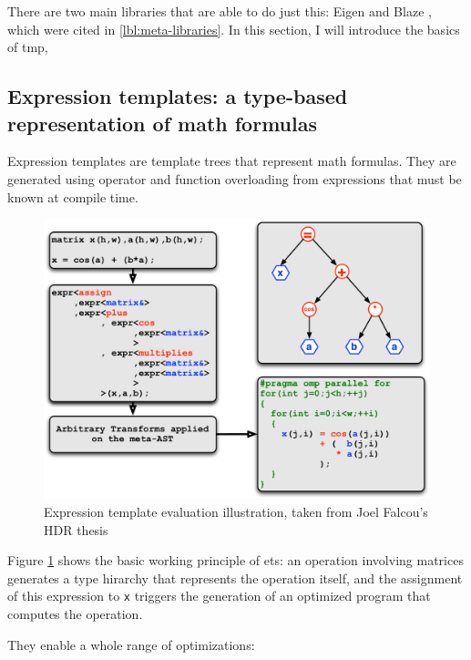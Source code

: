 \documentclass[../main]{subfiles}
\begin{document}
There are two main libraries that are able to do just this: Eigen \cite{eigen}
and Blaze \cite{blazelib}, which were cited in \ref{lbl:meta-libraries}.
In this section, I will introduce the basics of \cpp \gls{tmp},

\subsection{
  Expression templates: a type-based representation of math formulas
}

Expression templates are template trees that represent math formulas.
They are generated using operator and function overloading from expressions
that must be known at compile time.

\begin{figure}[h]
\includegraphics[width=\textwidth]{images/expressiontemplates}
\caption{
  Expression template evaluation illustration,
  taken from Joel Falcou's HDR thesis \cite{falcou-hdr}
}
\label{fig:expression-template-illustration}
\end{figure}

Figure \ref{fig:expression-template-illustration} shows the basic
working principle of \glspl{et}: an operation involving matrices generates
a type hirarchy that represents the operation itself, and the assignment
of this expression to \lstinline{x} triggers the generation of
an optimized program that computes the operation.

They enable a whole range of optimizations:
\end{document}
